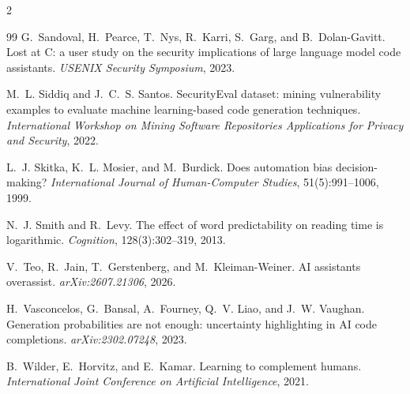 \documentclass[10pt]{article}
\begin{document}
\begin{multicols}{2}
\begin{thebibliography}{99}
G.~Sandoval, H.~Pearce, T.~Nys, R.~Karri, S.~Garg, and B.~Dolan-Gavitt.
Lost at C: a user study on the security implications of large language model code assistants.
\emph{USENIX Security Symposium}, 2023.

M.~L. Siddiq and J.~C.~S. Santos.
SecurityEval dataset: mining vulnerability examples to evaluate machine learning-based code
generation techniques.
\emph{International Workshop on Mining Software Repositories Applications for Privacy and Security},
2022.

L.~J. Skitka, K.~L. Mosier, and M.~Burdick.
Does automation bias decision-making?
\emph{International Journal of Human-Computer Studies}, 51(5):991--1006, 1999.

N.~J. Smith and R.~Levy.
The effect of word predictability on reading time is logarithmic.
\emph{Cognition}, 128(3):302--319, 2013.

V.~Teo, R.~Jain, T.~Gerstenberg, and M.~Kleiman-Weiner.
AI assistants overassist.
\emph{arXiv:2607.21306}, 2026.

H.~Vasconcelos, G.~Bansal, A.~Fourney, Q.~V. Liao, and J.~W. Vaughan.
Generation probabilities are not enough: uncertainty highlighting in AI code completions.
\emph{arXiv:2302.07248}, 2023.

B.~Wilder, E.~Horvitz, and E.~Kamar.
Learning to complement humans.
\emph{International Joint Conference on Artificial Intelligence}, 2021.

\end{thebibliography}
\end{multicols}
\end{document}
